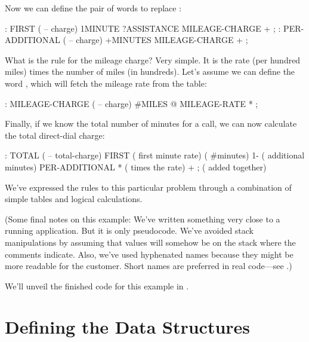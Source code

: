 Now we can define the pair of words to replace :


\begin{Code}
: FIRST  ( -- charge)
  1MINUTE  ?ASSISTANCE   MILEAGE-CHARGE + ;
: PER-ADDITIONAL  ( -- charge)
   +MINUTES  MILEAGE-CHARGE + ;
\end{Code}
What is the rule for the mileage charge? Very simple. It is the rate
(per hundred miles) times the number of miles (in hundreds). Let's
assume we can define the word , which will fetch
the mileage rate from the table:

\begin{Code}
: MILEAGE-CHARGE  ( -- charge)
   #MILES @  MILEAGE-RATE * ;
\end{Code}
Finally, if we know the total number of minutes for a call, we can now
calculate the total direct-dial charge:

\begin{Code}
: TOTAL   ( -- total-charge)
   FIRST                        ( first minute rate)
   ( #minutes) 1-               ( additional minutes)
      PER-ADDITIONAL *          ( times the rate)
   +  ;                         ( added together)
\end{Code}
We've expressed the rules to this particular problem through a
combination of simple tables and logical calculations.

(Some final notes on this example: We've written something very close
to a running \Forth{} application. But it is only pseudocode. We've
avoided stack manipulations by assuming that values will somehow be on
the stack where the comments indicate. Also, we've used hyphenated
names because they might be more readable for the customer. Short
names are preferred in real code---see .)

We'll unveil the finished code for this example in .

\section{Defining the Data Structures}

